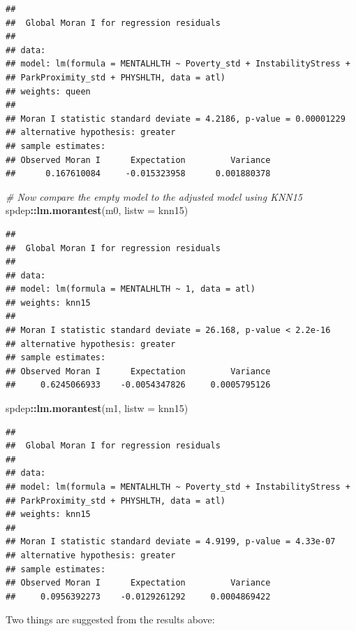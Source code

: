 \documentclass[
]{book}
\newenvironment{Shaded}{\begin{snugshade}}{\end{snugshade}}
\newcommand{\AttributeTok}[1]{\textcolor[rgb]{0.13,0.29,0.53}{#1}}
\newcommand{\CommentTok}[1]{\textcolor[rgb]{0.56,0.35,0.01}{\textit{#1}}}
\newcommand{\FunctionTok}[1]{\textcolor[rgb]{0.13,0.29,0.53}{\textbf{#1}}}
\newcommand{\NormalTok}[1]{#1}
\newcommand{\SpecialCharTok}[1]{\textcolor[rgb]{0.81,0.36,0.00}{\textbf{#1}}}
\begin{document}
\begin{verbatim}
## 
##  Global Moran I for regression residuals
## 
## data:  
## model: lm(formula = MENTALHLTH ~ Poverty_std + InstabilityStress +
## ParkProximity_std + PHYSHLTH, data = atl)
## weights: queen
## 
## Moran I statistic standard deviate = 4.2186, p-value = 0.00001229
## alternative hypothesis: greater
## sample estimates:
## Observed Moran I      Expectation         Variance 
##      0.167610084     -0.015323958      0.001880378
\end{verbatim}

\begin{Shaded}
\begin{Highlighting}[]
\CommentTok{\# Now compare the empty model to the adjusted model using KNN15 }
\NormalTok{spdep}\SpecialCharTok{::}\FunctionTok{lm.morantest}\NormalTok{(m0, }\AttributeTok{listw =}\NormalTok{ knn15)}
\end{Highlighting}
\end{Shaded}

\begin{verbatim}
## 
##  Global Moran I for regression residuals
## 
## data:  
## model: lm(formula = MENTALHLTH ~ 1, data = atl)
## weights: knn15
## 
## Moran I statistic standard deviate = 26.168, p-value < 2.2e-16
## alternative hypothesis: greater
## sample estimates:
## Observed Moran I      Expectation         Variance 
##     0.6245066933    -0.0054347826     0.0005795126
\end{verbatim}

\begin{Shaded}
\begin{Highlighting}[]
\NormalTok{spdep}\SpecialCharTok{::}\FunctionTok{lm.morantest}\NormalTok{(m1, }\AttributeTok{listw =}\NormalTok{ knn15)}
\end{Highlighting}
\end{Shaded}

\begin{verbatim}
## 
##  Global Moran I for regression residuals
## 
## data:  
## model: lm(formula = MENTALHLTH ~ Poverty_std + InstabilityStress +
## ParkProximity_std + PHYSHLTH, data = atl)
## weights: knn15
## 
## Moran I statistic standard deviate = 4.9199, p-value = 4.33e-07
## alternative hypothesis: greater
## sample estimates:
## Observed Moran I      Expectation         Variance 
##     0.0956392273    -0.0129261292     0.0004869422
\end{verbatim}

Two things are suggested from the results above:
\end{document}
